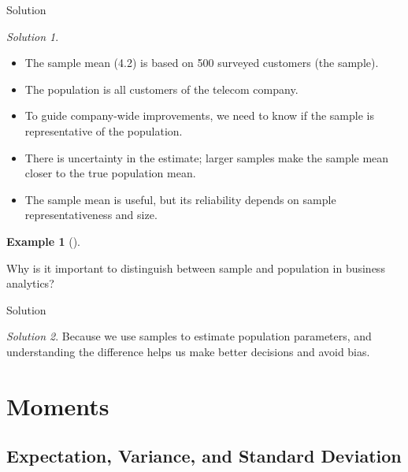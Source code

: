 \documentclass[
  12pt,
]{scrbook}
\providecommand{\tightlist}{%
  \setlength{\itemsep}{0pt}\setlength{\parskip}{0pt}}
\renewcommand{\tightlist}{\setlength{\itemsep}{0.5\baselineskip}\setlength{\parskip}{0.2\baselineskip}}
\theoremstyle{definition}
\newtheorem{example}{Example}[section]
\theoremstyle{remark}
\newtheorem{refsolution}{Solution}[section]
\begin{document}
Solution

\begin{refsolution}
\leavevmode

\begin{itemize}
\tightlist
\item
  The sample mean (4.2) is based on 500 surveyed customers (the sample).
\item
  The population is all customers of the telecom company.
\item
  To guide company-wide improvements, we need to know if the sample is
  representative of the population.
\item
  There is uncertainty in the estimate; larger samples make the sample
  mean closer to the true population mean.
\item
  The sample mean is useful, but its reliability depends on sample
  representativeness and size.
\end{itemize}

\label{sol-telecom}

\end{refsolution}

\begin{example}[]\protect\hypertarget{exm-3}{}\label{exm-3}

Why is it important to distinguish between sample and population in
business analytics?

\end{example}

Solution

\begin{refsolution}
\leavevmode

Because we use samples to estimate population parameters, and
understanding the difference helps us make better decisions and avoid
bias.

\label{sol-3}

\end{refsolution}

\section{Moments}\label{moments}

\subsection{Expectation, Variance, and Standard
Deviation}\label{expectation-variance-and-standard-deviation}
\end{document}
